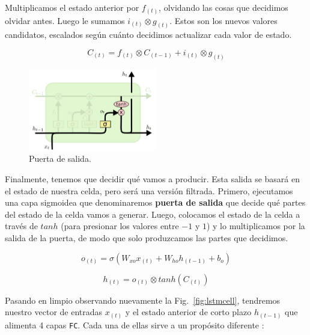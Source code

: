 \documentclass[a4paper,12pt]{article}
\begin{document}
Multiplicamos el estado anterior por $f_{(t)}$, olvidando las cosas que decidimos olvidar antes. Luego le sumamos $i_{(t)} \otimes g_{(t)}$. Estos son los nuevos valores candidatos, escalados según cuánto decidimos actualizar cada valor de estado.

$$C_{(t)} = f_{(t)} \otimes C_{(t-1)} + i_{(t)} \otimes g_{(t)}$$

\begin{figure}[H]
	\begin{center}				
		\includegraphics[width=0.5\textwidth]{lstm5.png}
		\caption{Puerta de salida. \citep{olahlstm}}
		\label{fig:lstm5}
	\end{center}
\end{figure}

\clearpage

Finalmente, tenemos que decidir qué vamos a producir. Esta salida se basará en el estado de nuestra celda, pero será una versión filtrada. Primero, ejecutamos una capa sigmoidea que denominaremos \textbf{puerta de salida} que decide qué partes del estado de la celda vamos a generar. Luego, colocamos el estado de la celda a través de $tanh$ (para presionar los valores entre $-1$ y $1$) y lo multiplicamos por la salida de la puerta, de modo que solo produzcamos las partes que decidimos.

$$ o_{(t)}=\sigma (W_{xo}x_{(t)} + W_{ho}h_{(t-1)} + b_o) $$

$$ h_{(t)}=o_{(t)} \otimes tanh(C_{(t)})$$

Pasando en limpio observando nuevamente la Fig.~\ref{fig:lstmcell}, tendremos nuestro vector de entradas $x_{(t)}$ y el estado anterior de corto plazo $h_{(t-1)}$ que alimenta 4 capas \texttt{FC}. Cada una de ellas sirve a un propósito diferente \citep{geron}:
\end{document}
